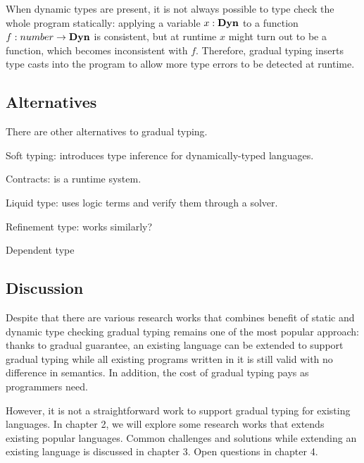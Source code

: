 
When dynamic types are present, it is not always possible to type check the whole
program statically: applying a variable $x : \textbf{Dyn}$ to a function $f : number \rightarrow \textbf{Dyn}$ is consistent, but at runtime $x$ might turn out to be a function, which becomes inconsistent
with $f$. Therefore, gradual typing inserts type casts into the program to allow
more type errors to be detected at runtime.


\subsection{Alternatives}

There are other alternatives to gradual typing.

Soft typing: introduces type inference for dynamically-typed languages.

Contracts: is a runtime system.

Liquid type: uses logic terms and verify them through a solver.

Refinement type: works similarly?

Dependent type

\subsection{Discussion}

Despite that there are various research works that combines
benefit of static and dynamic type checking
gradual typing remains one of the most popular approach:
thanks to gradual guarantee, an existing language can be extended to
support gradual typing while all existing programs written in it is still valid
with no difference in semantics. In addition, the cost of gradual typing pays
as programmers need.


However, it is not a straightforward work to support gradual typing for existing languages.
In chapter 2, we will explore some research works that extends existing popular languages.
Common challenges and solutions while extending an existing language is discussed in chapter 3.
Open questions in chapter 4.

